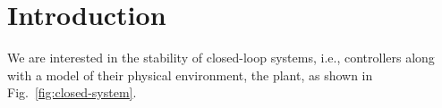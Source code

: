 \documentclass{sig-alternate-05-2015}
\begin{document}
%

\maketitle
\begin{abstract}

\end{abstract}


%
%
\printccsdesc


\keywords{}

\section{Introduction}

We are interested in the stability of closed-loop systems, i.e.,
controllers along with a model of their physical environment, the
plant, as shown in Fig.~\ref{fig:closed-system}.
\end{document}
